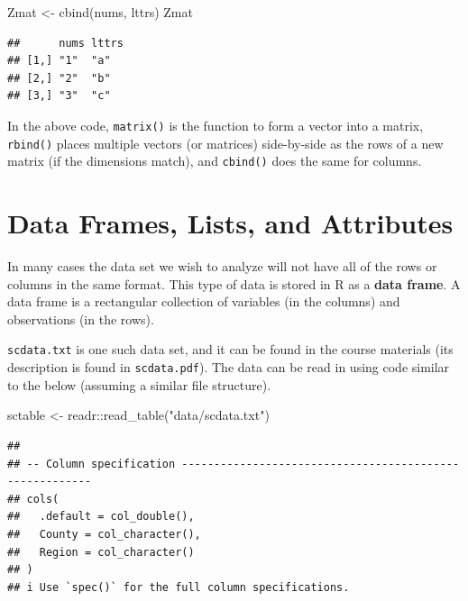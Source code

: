 \documentclass[
]{book}
\newenvironment{Shaded}{\begin{snugshade}}{\end{snugshade}}
\newcommand{\FunctionTok}[1]{\textcolor[rgb]{0.00,0.00,0.00}{#1}}
\newcommand{\NormalTok}[1]{#1}
\newcommand{\OtherTok}[1]{\textcolor[rgb]{0.56,0.35,0.01}{#1}}
\newcommand{\SpecialCharTok}[1]{\textcolor[rgb]{0.00,0.00,0.00}{#1}}
\newcommand{\StringTok}[1]{\textcolor[rgb]{0.31,0.60,0.02}{#1}}
\begin{document}
\begin{Shaded}
\begin{Highlighting}[]
\NormalTok{Zmat }\OtherTok{\textless{}{-}} \FunctionTok{cbind}\NormalTok{(nums, lttrs)}
\NormalTok{Zmat}
\end{Highlighting}
\end{Shaded}

\begin{verbatim}
##      nums lttrs
## [1,] "1"  "a"  
## [2,] "2"  "b"  
## [3,] "3"  "c"
\end{verbatim}

In the above code, \texttt{matrix()} is the function to form a vector into a matrix, \texttt{rbind()} places multiple vectors (or matrices) side-by-side as the rows of a new matrix (if the dimensions match), and \texttt{cbind()} does the same for columns.

\hypertarget{data-frames-lists-and-attributes}{%
\section{Data Frames, Lists, and Attributes}\label{data-frames-lists-and-attributes}}

In many cases the data set we wish to analyze will not have all of the rows or columns in the same format. This type of data is stored in R as a \textbf{data frame}. A data frame is a rectangular collection of variables (in the columns) and observations (in the rows).

\texttt{scdata.txt} is one such data set, and it can be found in the course materials (its description is found in \texttt{scdata.pdf}). The data can be read in using code similar to the below (assuming a similar file structure).

\begin{Shaded}
\begin{Highlighting}[]
\NormalTok{sctable }\OtherTok{\textless{}{-}}\NormalTok{ readr}\SpecialCharTok{::}\FunctionTok{read\_table}\NormalTok{(}\StringTok{"data/scdata.txt"}\NormalTok{)}
\end{Highlighting}
\end{Shaded}

\begin{verbatim}
## 
## -- Column specification --------------------------------------------------------
## cols(
##   .default = col_double(),
##   County = col_character(),
##   Region = col_character()
## )
## i Use `spec()` for the full column specifications.
\end{verbatim}
\end{document}
